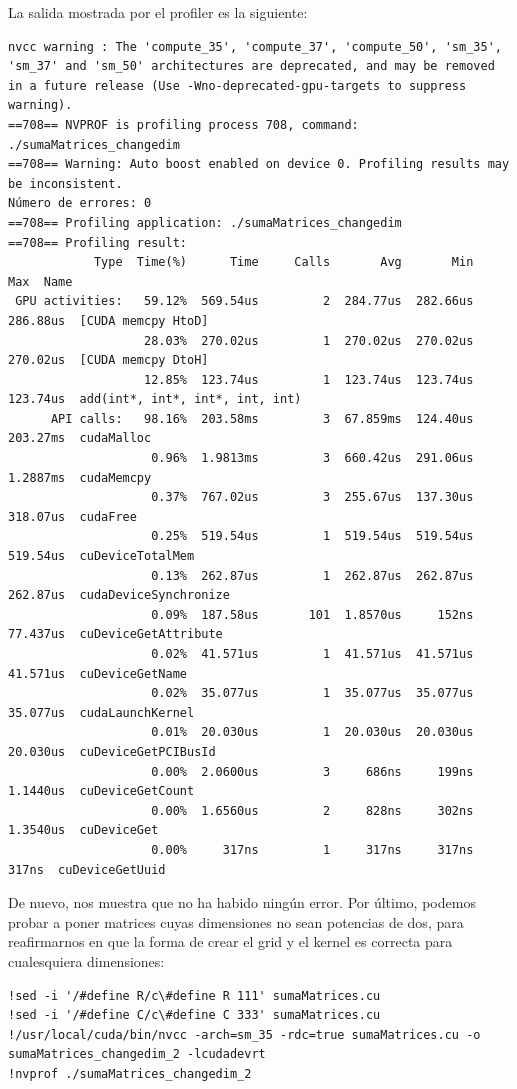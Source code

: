 \documentclass[11pt]{article}
\theoremstyle{plain}
\begin{document}
La salida mostrada por el profiler es la siguiente:

\begin{verbatim}
nvcc warning : The 'compute_35', 'compute_37', 'compute_50', 'sm_35', 'sm_37' and 'sm_50' architectures are deprecated, and may be removed in a future release (Use -Wno-deprecated-gpu-targets to suppress warning).
==708== NVPROF is profiling process 708, command: ./sumaMatrices_changedim
==708== Warning: Auto boost enabled on device 0. Profiling results may be inconsistent.
Número de errores: 0
==708== Profiling application: ./sumaMatrices_changedim
==708== Profiling result:
            Type  Time(%)      Time     Calls       Avg       Min       Max  Name
 GPU activities:   59.12%  569.54us         2  284.77us  282.66us  286.88us  [CUDA memcpy HtoD]
                   28.03%  270.02us         1  270.02us  270.02us  270.02us  [CUDA memcpy DtoH]
                   12.85%  123.74us         1  123.74us  123.74us  123.74us  add(int*, int*, int*, int, int)
      API calls:   98.16%  203.58ms         3  67.859ms  124.40us  203.27ms  cudaMalloc
                    0.96%  1.9813ms         3  660.42us  291.06us  1.2887ms  cudaMemcpy
                    0.37%  767.02us         3  255.67us  137.30us  318.07us  cudaFree
                    0.25%  519.54us         1  519.54us  519.54us  519.54us  cuDeviceTotalMem
                    0.13%  262.87us         1  262.87us  262.87us  262.87us  cudaDeviceSynchronize
                    0.09%  187.58us       101  1.8570us     152ns  77.437us  cuDeviceGetAttribute
                    0.02%  41.571us         1  41.571us  41.571us  41.571us  cuDeviceGetName
                    0.02%  35.077us         1  35.077us  35.077us  35.077us  cudaLaunchKernel
                    0.01%  20.030us         1  20.030us  20.030us  20.030us  cuDeviceGetPCIBusId
                    0.00%  2.0600us         3     686ns     199ns  1.1440us  cuDeviceGetCount
                    0.00%  1.6560us         2     828ns     302ns  1.3540us  cuDeviceGet
                    0.00%     317ns         1     317ns     317ns     317ns  cuDeviceGetUuid
\end{verbatim}

De nuevo, nos muestra que no ha habido ningún error. Por último, podemos probar a poner matrices cuyas dimensiones no sean potencias de dos, para reafirmarnos en que la forma de crear el grid y el kernel es correcta para cualesquiera dimensiones:

\begin{verbatim}
!sed -i '/#define R/c\#define R 111' sumaMatrices.cu
!sed -i '/#define C/c\#define C 333' sumaMatrices.cu
!/usr/local/cuda/bin/nvcc -arch=sm_35 -rdc=true sumaMatrices.cu -o sumaMatrices_changedim_2 -lcudadevrt
!nvprof ./sumaMatrices_changedim_2
\end{verbatim}
\end{document}

